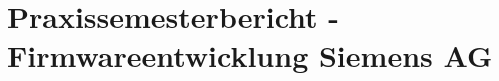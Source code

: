 \documentclass[11pt,fleqn,openany]{book} %
\begin{document}
\tableofcontents %

\cleardoublepage
{}\listoffigures

\cleardoublepage
{}\listoftables


\pagestyle{fancy} %


\part{Praxissemesterbericht - Firmwareentwicklung Siemens AG}

 











\end{document}

